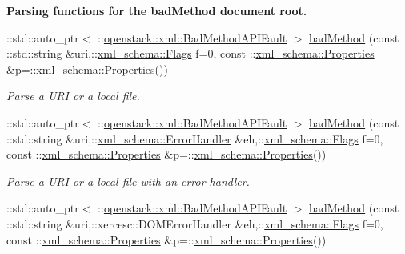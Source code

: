 \begin{Indent}{\bf Parsing functions for the badMethod document root.}\par
\begin{DoxyCompactItemize}
\item 
::std::auto\_\-ptr$<$ ::\hyperlink{classopenstack_1_1xml_1_1BadMethodAPIFault}{openstack::xml::BadMethodAPIFault} $>$ \hyperlink{namespaceopenstack_1_1xml_a59c6d3b7145a43b2cb47a07f2b405622}{badMethod} (const ::std::string \&uri,::\hyperlink{namespacexml__schema_affb4c227cbd9aa7453dd1dc5a1401943}{xml\_\-schema::Flags} f=0, const ::\hyperlink{namespacexml__schema_ad27ce19a7ee1d3b1064092648898f64c}{xml\_\-schema::Properties} \&p=::\hyperlink{namespacexml__schema_ad27ce19a7ee1d3b1064092648898f64c}{xml\_\-schema::Properties}())
\begin{DoxyCompactList}\small\item\em Parse a URI or a local file. \item\end{DoxyCompactList}\item 
::std::auto\_\-ptr$<$ ::\hyperlink{classopenstack_1_1xml_1_1BadMethodAPIFault}{openstack::xml::BadMethodAPIFault} $>$ \hyperlink{namespaceopenstack_1_1xml_a2a0b748998d9e073d2e70d37b9fcf312}{badMethod} (const ::std::string \&uri,::\hyperlink{namespacexml__schema_ab1c9361bfd3b404eaabf0c31eded79dc}{xml\_\-schema::ErrorHandler} \&eh,::\hyperlink{namespacexml__schema_affb4c227cbd9aa7453dd1dc5a1401943}{xml\_\-schema::Flags} f=0, const ::\hyperlink{namespacexml__schema_ad27ce19a7ee1d3b1064092648898f64c}{xml\_\-schema::Properties} \&p=::\hyperlink{namespacexml__schema_ad27ce19a7ee1d3b1064092648898f64c}{xml\_\-schema::Properties}())
\begin{DoxyCompactList}\small\item\em Parse a URI or a local file with an error handler. \item\end{DoxyCompactList}\item 
::std::auto\_\-ptr$<$ ::\hyperlink{classopenstack_1_1xml_1_1BadMethodAPIFault}{openstack::xml::BadMethodAPIFault} $>$ \hyperlink{namespaceopenstack_1_1xml_ac7a9d00ede29317404b6925033a3ab8e}{badMethod} (const ::std::string \&uri,::xercesc::DOMErrorHandler \&eh,::\hyperlink{namespacexml__schema_affb4c227cbd9aa7453dd1dc5a1401943}{xml\_\-schema::Flags} f=0, const ::\hyperlink{namespacexml__schema_ad27ce19a7ee1d3b1064092648898f64c}{xml\_\-schema::Properties} \&p=::\hyperlink{namespacexml__schema_ad27ce19a7ee1d3b1064092648898f64c}{xml\_\-schema::Properties}())

\end{DoxyCompactItemize}
\end{Indent}
